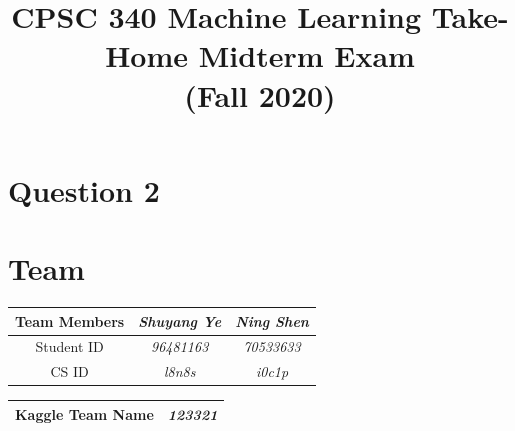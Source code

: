 
\lstset{style=mystyle}
\def\R{\mathbb{R}}
\def\argmax{\mathop{\rm arg\,max}}
\def\argmin{\mathop{\rm arg\,min}}
\newcommand{\mat}[1]{\begin{bmatrix}#1\end{bmatrix}}
\newcommand{\alignStar}[1]{\begin{align*}#1\end{align*}}
\def\half{\frac 1 2}

\newcommand{\fig}[2]{\texttt{[image: \#2]}}
\newcommand{\centerfig}[2]{\begin{center}\texttt{[image: \#2]}\end{center}}
\def\items#1{\begin{itemize}#1\end{itemize}}
\def\enum#1{\begin{enumerate}#1\end{enumerate}}



\title{CPSC 340 Machine Learning Take-Home Midterm Exam\\ (Fall 2020)}


\section*{Question 2}
\setcounter{section}{0}

\section{Team}
\begin{tabular}{|c | c | c |} 
\hline
Team Members & \emph{Shuyang Ye} & \emph{Ning Shen} \\
\hline
Student ID & \emph{96481163} & \emph{70533633} \\
\hline
CS ID & \emph{l8n8s} & \emph{i0c1p} \\
\hline
\end{tabular}
\begin{tabular}{|c | c |} 
\hline
Kaggle Team Name & \emph{123321}\\
\hline
\end{tabular}
